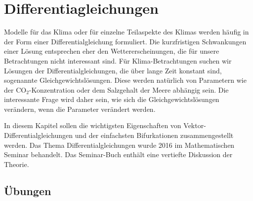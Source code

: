 %
%
%
\chapter{Differentiagleichungen\label{chapter:dgl}}
Modelle für das Klima oder für einzelne Teilaspekte des Klimas 
werden häufig in der Form einer Differentialgleichung formuliert.
Die kurzfristigen Schwankungen einer Lösung entsprechen 
eher den Wettererscheinungen, die für unsere Betrachtungen nicht
interessant sind.
Für Klima-Betrachtungen suchen wir Lösungen der Differentialgleichungen,
die über lange Zeit konstant sind, sogenannte Gleichgewichtslösungen.
Diese werden natürlich von Parametern wie der $\text{CO}_2$-Konzentration
oder dem Salzgehalt der Meere abhängig sein.
Die interessante Frage wird daher sein, wie sich die Gleichgewichtslösungen
verändern, wenn die Parameter verändert werden.

In diesem Kapitel sollen die wichtigsten Eigenschaften von
Vektor-Differentialgleichungen und der einfachsten Bifurkationen
zusammengestellt werden.
Das Thema Differentialgleichungen wurde 2016 im Mathematischen Seminar
behandelt.
Das Seminar-Buch \cite{skript:mathsem-dgl} enthält eine vertiefte Diskussion
der Theorie.






\section*{Übungen}
\begin{uebungsaufgaben}
\item

\end{uebungsaufgaben}

